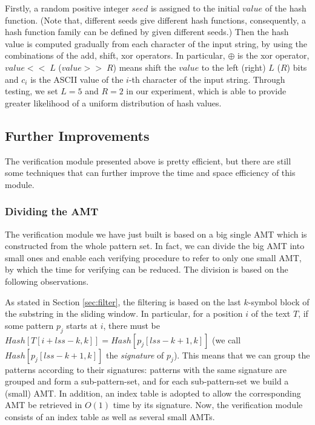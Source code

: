 \documentclass{article}
\begin{document}
Firstly, a random positive integer $seed$ is assigned to the initial
$value$ of the hash function. (Note that, different seeds give
different hash functions, consequently, a hash function family can be
defined by given different seeds.) Then the hash value is computed
gradually from each character of the input string, by using the
combinations of the \textsf{add, shift, xor} operators. In particular,
$\oplus$ is the \textsf{xor} operator, $value << \;L$ ($value >> \;R$)
means shift the $value$ to the left (right) $L$ ($R$) bits and $c_i$
is the ASCII value of the $i$-th character of the input
string. Through testing, we set $L=5$ and $R=2$ in our experiment,
which is able to provide greater likelihood of a uniform distribution
of hash values.

\subsection{Further Improvements}
\label{sec:further improments}

The verification module presented above is pretty efficient, but there
are still some techniques that can further improve the time and space
efficiency of this module.

\subsubsection{Dividing the AMT}
\label{sec:divide amt}

The verification module we have just built is based on a big single
AMT which is constructed from the whole pattern set. In fact, we can
divide the big AMT into small ones and enable each verifying procedure
to refer to only one small AMT, by which the time for verifying can be
reduced. The division is based on the following observations.

As stated in Section \ref{sec:filter}, the filtering is based on the
last $k$-symbol block of the substring in the sliding window. In
particular, for a position $i$ of the text $T$, if some pattern $p_j$
starts at $i$, there must be
$Hash[T[i+lss-k,k]] = Hash[p_j[lss-k+1,k]]$ (we call
$Hash[p_j[lss-k+1,k]]$ the \emph{signature} of $p_j$). This means that
we can group the patterns according to their signatures: patterns with
the same signature are grouped and form a sub-pattern-set, and for
each sub-pattern-set we build a (small) AMT. In addition, an index
table is adopted to allow the corresponding AMT be retrieved in $O(1)$
time by its signature. Now, the verification module consists of an
index table as well as several small AMTs.
\end{document}
